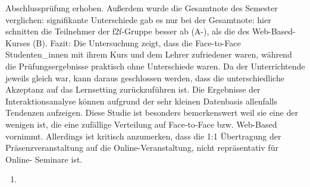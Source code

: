 \documentclass[12pt, bibliography=totoc]{scrartcl}
\begin{document}
Abschlussprüfung erhoben. Außerdem wurde die Gesamtnote des Semester
verglichen: signifikante Unterschiede gab es nur bei der Gesamtnote:
hier schnitten die Teilnehmer der f2f-Gruppe besser ab (A-), als die des
Web-Based-Kurses (B). Fazit: Die Untersuchung zeigt, dass die
Face-to-Face Studenten\_innen mit ihrem Kurs und dem Lehrer zufriedener
waren, während die Prüfungsergebnisse praktisch ohne Unterschiede waren.
Da der Unterrichtende jeweils gleich war, kann daraus geschlossen
werden, dass die unterschiedliche Akzeptanz auf das Lernsetting
zurückzuführen ist. Die Ergebnisse der Interaktionsanalyse können
aufgrund der sehr kleinen Datenbasis allenfalls Tendenzen aufzeigen.
Diese Studie ist besonders bemerkenswert weil sie eine der wenigen ist,
die eine zufällige Verteilung auf Face-to-Face bzw. Web-Based vornimmt.
Allerdings ist kritisch anzumerken, dass die 1:1 Übertragung der
Präsenzveranstaltung auf die Online-Veranstaltung, nicht repräsentativ
für Online- Seminare ist.

\begin{enumerate}
\def\labelenumi{\arabic{enumi}.}
\setcounter{enumi}{4}
\itemsep1pt\parskip0pt
\item
  \textbf{}
\end{enumerate}
\end{document}
